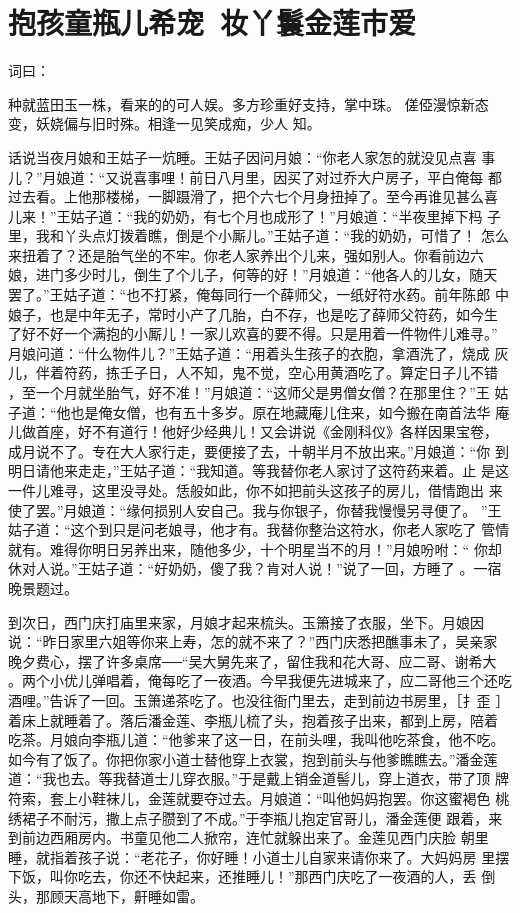\chapter{抱孩童瓶儿希宠~妆丫鬟金莲市爱}

词曰：

种就蓝田玉一株，看来的的可人娱。多方珍重好支持，掌中珠。
傞俹漫惊新态变，妖娆偏与旧时殊。相逢一见笑成痴，少人
知。

话说当夜月娘和王姑子一炕睡。王姑子因问月娘：“你老人家怎的就没见点喜
事儿？”月娘道：“又说喜事哩！前日八月里，因买了对过乔大户房子，平白俺每
都过去看。上他那楼梯，一脚蹑滑了，把个六七个月身扭掉了。至今再谁见甚么喜
儿来！”王姑子道：“我的奶奶，有七个月也成形了！”月娘道：“半夜里掉下杩
子里，我和丫头点灯拨着瞧，倒是个小厮儿。”王姑子道：“我的奶奶，可惜了！
怎么来扭着了？还是胎气坐的不牢。你老人家养出个儿来，强如别人。你看前边六
娘，进门多少时儿，倒生了个儿子，何等的好！”月娘道：“他各人的儿女，随天
罢了。”王姑子道：“也不打紧，俺每同行一个薛师父，一纸好符水药。前年陈郎
中娘子，也是中年无子，常时小产了几胎，白不存，也是吃了薛师父符药，如今生
了好不好一个满抱的小厮儿！一家儿欢喜的要不得。只是用着一件物件儿难寻。”
月娘问道：“什么物件儿？”王姑子道：“用着头生孩子的衣胞，拿酒洗了，烧成
灰儿，伴着符药，拣壬子日，人不知，鬼不觉，空心用黄酒吃了。算定日子儿不错
，至一个月就坐胎气，好不准！”月娘道：“这师父是男僧女僧？在那里住？”王
姑子道：“他也是俺女僧，也有五十多岁。原在地藏庵儿住来，如今搬在南首法华
庵儿做首座，好不有道行！他好少经典儿！又会讲说《金刚科仪》各样因果宝卷，
成月说不了。专在大人家行走，要便接了去，十朝半月不放出来。”月娘道：“你
到明日请他来走走，”王姑子道：“我知道。等我替你老人家讨了这符药来着。止
是这一件儿难寻，这里没寻处。恁般如此，你不如把前头这孩子的房儿，借情跑出
来使了罢。”月娘道：“缘何损别人安自己。我与你银子，你替我慢慢另寻便了。
”王姑子道：“这个到只是问老娘寻，他才有。我替你整治这符水，你老人家吃了
管情就有。难得你明日另养出来，随他多少，十个明星当不的月！”月娘吩咐：“
你却休对人说。”王姑子道：“好奶奶，傻了我？肯对人说！”说了一回，方睡了
。一宿晚景题过。

到次日，西门庆打庙里来家，月娘才起来梳头。玉箫接了衣服，坐下。月娘因
说：“昨日家里六姐等你来上寿，怎的就不来了？”西门庆悉把醮事未了，吴亲家
晚夕费心，摆了许多桌席──“吴大舅先来了，留住我和花大哥、应二哥、谢希大
。两个小优儿弹唱着，俺每吃了一夜酒。今早我便先进城来了，应二哥他三个还吃
酒哩。”告诉了一回。玉箫递茶吃了。也没往衙门里去，走到前边书房里，［扌歪
］着床上就睡着了。落后潘金莲、李瓶儿梳了头，抱着孩子出来，都到上房，陪着
吃茶。月娘向李瓶儿道：“他爹来了这一日，在前头哩，我叫他吃茶食，他不吃。
如今有了饭了。你把你家小道士替他穿上衣裳，抱到前头与他爹瞧瞧去。”潘金莲
道：“我也去。等我替道士儿穿衣服。”于是戴上销金道髻儿，穿上道衣，带了顶
牌符索，套上小鞋袜儿，金莲就要夺过去。月娘道：“叫他妈妈抱罢。你这蜜褐色
桃绣裙子不耐污，撒上点子臜到了不成。”于李瓶儿抱定官哥儿，潘金莲便
跟着，来到前边西厢房内。书童见他二人掀帘，连忙就躲出来了。金莲见西门庆脸
朝里睡，就指着孩子说：“老花子，你好睡！小道士儿自家来请你来了。大妈妈房
里摆下饭，叫你吃去，你还不快起来，还推睡儿！”那西门庆吃了一夜酒的人，丢
倒头，那顾天高地下，鼾睡如雷。

